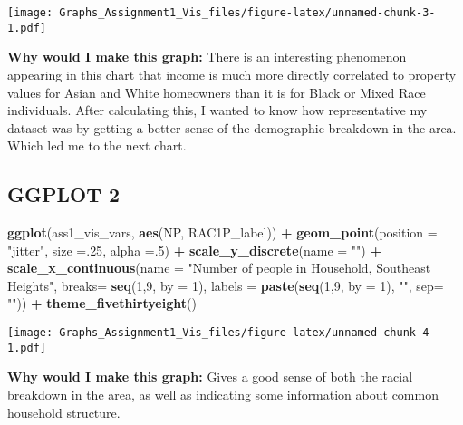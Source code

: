 \documentclass[
]{article}
\newenvironment{Shaded}{\begin{snugshade}}{\end{snugshade}}
\newcommand{\DataTypeTok}[1]{\textcolor[rgb]{0.13,0.29,0.53}{#1}}
\newcommand{\DecValTok}[1]{\textcolor[rgb]{0.00,0.00,0.81}{#1}}
\newcommand{\KeywordTok}[1]{\textcolor[rgb]{0.13,0.29,0.53}{\textbf{#1}}}
\newcommand{\NormalTok}[1]{#1}
\newcommand{\OperatorTok}[1]{\textcolor[rgb]{0.81,0.36,0.00}{\textbf{#1}}}
\newcommand{\StringTok}[1]{\textcolor[rgb]{0.31,0.60,0.02}{#1}}
\begin{document}
\texttt{[image: Graphs\_Assignment1\_Vis\_files/figure-latex/unnamed-chunk-3-1.pdf]}

\textbf{Why would I make this graph:} There is an interesting phenomenon
appearing in this chart that income is much more directly correlated to
property values for Asian and White homeowners than it is for Black or
Mixed Race individuals. After calculating this, I wanted to know how
representative my dataset was by getting a better sense of the
demographic breakdown in the area. Which led me to the next chart.

\hypertarget{ggplot-2}{%
\subsection{GGPLOT 2}\label{ggplot-2}}

\begin{Shaded}
\begin{Highlighting}[]
\KeywordTok{ggplot}\NormalTok{(ass1_vis_vars, }\KeywordTok{aes}\NormalTok{(NP, RAC1P_label)) }\OperatorTok{+}
\StringTok{       }\KeywordTok{geom_point}\NormalTok{(}\DataTypeTok{position =} \StringTok{"jitter"}\NormalTok{, }\DataTypeTok{size =}\NormalTok{.}\DecValTok{25}\NormalTok{, }\DataTypeTok{alpha =}\NormalTok{.}\DecValTok{5}\NormalTok{) }\OperatorTok{+}\StringTok{ }
\StringTok{      }\KeywordTok{scale_y_discrete}\NormalTok{(}\DataTypeTok{name =} \StringTok{""}\NormalTok{) }\OperatorTok{+}
\StringTok{      }\KeywordTok{scale_x_continuous}\NormalTok{(}\DataTypeTok{name =} \StringTok{"Number of people in Household, Southeast Heights"}\NormalTok{,}
                                 \DataTypeTok{breaks=} \KeywordTok{seq}\NormalTok{(}\DecValTok{1}\NormalTok{,}\DecValTok{9}\NormalTok{, }\DataTypeTok{by =} \DecValTok{1}\NormalTok{),}
                                \DataTypeTok{labels =} \KeywordTok{paste}\NormalTok{(}\KeywordTok{seq}\NormalTok{(}\DecValTok{1}\NormalTok{,}\DecValTok{9}\NormalTok{, }\DataTypeTok{by =} \DecValTok{1}\NormalTok{), }\StringTok{""}\NormalTok{, }\DataTypeTok{sep=} \StringTok{""}\NormalTok{)) }\OperatorTok{+}
\StringTok{  }\KeywordTok{theme_fivethirtyeight}\NormalTok{()}
\end{Highlighting}
\end{Shaded}

\texttt{[image: Graphs\_Assignment1\_Vis\_files/figure-latex/unnamed-chunk-4-1.pdf]}

\textbf{Why would I make this graph:} Gives a good sense of both the
racial breakdown in the area, as well as indicating some information
about common household structure.
\end{document}
